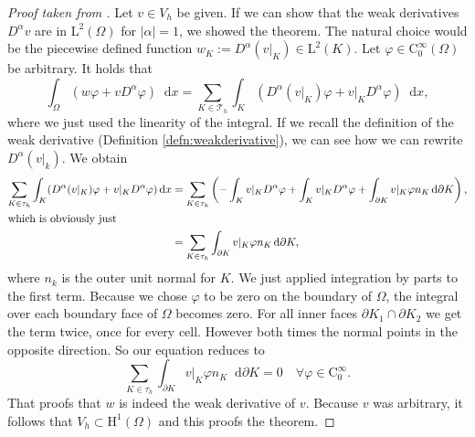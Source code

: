 \documentclass[12pt,a4paper,twoside, open=right]{scrreprt}
\theoremstyle{definition}
\theoremstyle{plain}
\newcommand{\abs}[1]{\left\vert #1\right\vert}
\newcommand{\D}{\mathop{}\!\mathrm{d}}
\begin{document}
\begin{proof}[Proof taken from \cite{Ganesan2017}]
    Let $v\in V_h$ be given. If we can show that the weak derivatives $D^\alpha v$ are in $ \mathrm{L}^2(\Omega)$ for $\abs{\alpha}=1$, we showed the theorem. The natural choice would be the piecewise defined function $w_K:=D^\alpha(v\vert_K)\in \mathrm{L}^2(K)$. Let $\varphi\in \mathrm{C}^\infty_0(\Omega)$ be arbitrary. It holds that 
    \begin{equation}
        \int_\Omega(w\varphi+vD^\alpha \varphi)\D x = \sum_{K\in\mathcal{T}_h}\int_K(D^\alpha(v\vert_K)\varphi+v\vert_K D^\alpha\varphi)\D x,
    \end{equation}
    where we just used the linearity of the integral. If we recall the definition of the weak derivative (Definition \ref{defn:weakderivative}), we can see how we can rewrite $D^\alpha(v\vert_k)$. We obtain
    \begin{align}
        \sum_{K\in\tau_h}\int_K(D^\alpha(v\vert_K)\varphi+v\vert_K D^\alpha\varphi)\D x&=\sum_{K\in\tau_h}\left(-\int_K v\vert_KD^\alpha\varphi+\int_K v\vert_K D^\alpha\varphi +\int_{\partial K}v\vert_K\varphi n_K\D\partial K\right),\\\intertext{which is obviously just}& =\sum_{K\in\tau_h}\int_{\partial K}v\vert_K\varphi n_K\D\partial K,
    \end{align}
    where $n_k$ is the outer unit normal for $K$. We just applied integration by parts to the first term. Because we chose $\varphi$ to be zero on the boundary of $\Omega$, the integral over each boundary face of $\Omega$ becomes zero. For all inner faces $\partial K_1\cap \partial K_2$ we get the term twice, once for every cell. However both times the normal points in the opposite direction. So our equation reduces to 
    \begin{equation}
        \sum_{K\in\tau_h}\int_{\partial K}v\vert_K\varphi n_K\D\partial K=0 \quad \forall\varphi\in \mathrm{C}^\infty_0.
    \end{equation}
    That proofs that $w$ is indeed the weak derivative of $v$. Because $v$ was arbitrary, it follows that $V_h\subset \mathrm{H}^1(\Omega)$ and this proofs the theorem.
\end{proof}
\end{document}
